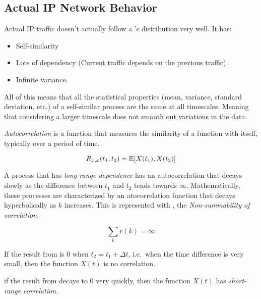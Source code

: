 \subsection{Actual IP Network Behavior}\label{subsec:Actual_IP_Behavior}
Actual IP traffic doesn't actually follow a 's distribution very well.
It has:
\begin{itemize}[noitemsep]
\item Self-similarity
\item Lots of dependency (Current traffic depends on the previous traffic).
\item Infinite variance.
\end{itemize}

All of this means that all the statistical properties (mean, variance, standard deviation, etc.) of a self-similar process are the same at all timescales.
Meaning that considering a larger timescale does not smooth out variations in the data.

\begin{definition}[Autocorrelation]\label{def:Autocorrelation}
  \emph{Autocorrelation} is a function that measures the similarity of a function with itself, typically over a period of time.

  \begin{equation}\label{eq:Autocorrelation}
    R_{x, x}(t_{1}, t_{2}) = \operatorname{\operatorname{\mathbb{E}}}[X(t_{1}), X(t_{2})]
  \end{equation}
\end{definition}

\begin{definition}\label{def:Long_Range_Dependence}
  A process that has \emph{long-range dependence} has an autocorrelation that decays slowly as the difference between $t_{1}$ and $t_{2}$ tends towards $\infty$.
  Mathematically, these processes are characterized by an atocorrelation function that decays hyperbolically as $k$ increases.
  This is represented with , the \emph{Non-summability of correlation}.

  \begin{equation}\label{eq:Non_Summability_Correlation}
    \sum\limits_{k} r(k) = \infty
  \end{equation}

  \begin{remark}[Uncorrelated]
    If the result from  is 0 when $t_{2} = t_{1} + \Delta t$, i.e.\ when the time difference is very small, then the function $X(t)$ is no correlation.
  \end{remark}

  \begin{remark}
    if the result from  decays to 0 very quickly, then the function $X(t)$ has \emph{short-range correlation}.
  \end{remark}
\end{definition}

